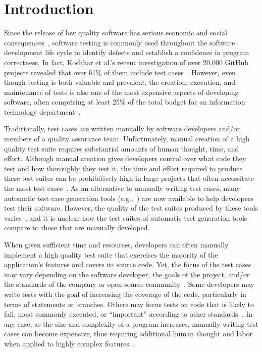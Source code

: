 
\section{Introduction}


Since the release of low quality software has serious economic and social consequences~\cite{tassey2002}, software testing is commonly used throughout the software development life cycle to identify defects and establish a confidence in program correctness. In fact, Kochhar et al.'s recent investigation of over 20,000 GitHub projects revealed that over 61\% of them include test cases~\cite{kochhar2013}.  However, even though testing is both valuable and prevalent, the creation, execution, and maintenance of tests is also one of the most expensive aspects of developing software, often comprising at least 25\% of the total budget for an information technology department~\cite{vizard2013}.  


Traditionally, test cases are written manually by software developers and/or members of a quality assurance team.  Unfortunately, manual creation of a high quality test suite requires substantial amounts of human thought, time, and effort.  Although manual creation gives developers control over what code they test and how thoroughly they test it, the time and effort required to produce these test suites can be prohibitively high in large projects that often necessitate the most test cases~\cite{kochhar2013}.  As an alternative to manually writing test cases, many automatic test case generation tools (e.g.,~\cite{fraser:2011:eat:2025113.2025179,pacheco2007feedback,csallner2004}) are now available to help developers test their software.  However, the quality of the test suites produced by these tools varies~\cite{bacchelli2008,fraser2013c,fraser2013a}, and it is unclear how the test suites of automatic test generation tools compare to those that are manually developed.


When given sufficient time and resources, developers can often manually implement a high quality test suite that exercises the majority of the application's features and covers its source code.  Yet, the focus of the test cases may vary depending on the software developer, the goals of the project, and/or the standards of the company or open-source community~\cite{kochhar2013}.  Some developers may write tests with the goal of increasing the coverage of the code, particularly in terms of statements or branches.  Others may focus tests on code that is likely to fail, most commonly executed, or ``important'' according to other standards~\cite{mockus2009}. In any case, as the size and complexity of a program increases, manually writing test cases can become expensive, thus requiring additional human thought and labor when applied to highly complex features~\cite{clarke1998automated}.

